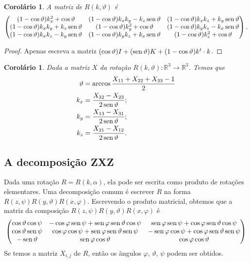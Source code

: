 \documentclass[12pt]{amsart}
\newcommand{\R}{\mathbb R}
\DeclareMathOperator{\sen}{\textrm{\rm sen}}
\newtheorem{corollary}[theorem]{Corolário}
\theoremstyle{definition}
\begin{document}
\begin{corollary}
    A matriz de $R(k,\vartheta)$ é 
    \[
        \begin{pmatrix}
            (1-\cos\vartheta)k_x^2+\cos\vartheta & (1-\cos\vartheta)k_xk_y-k_z\sen\vartheta  & 
            (1-\cos\vartheta)k_xk_z+k_y\sen\vartheta \\
            (1-\cos\vartheta)k_xk_y+k_z\sen\vartheta  & (1-\cos\vartheta)k_y^2+\cos\vartheta  & 
            (1-\cos\vartheta)k_yk_z-k_x\sen\vartheta \\
            (1-\cos\vartheta)k_xk_z-k_y\sen\vartheta & (1-\cos\vartheta)k_yk_z+k_x\sen\vartheta  & 
            (1-\cos\vartheta)k_z^2+\cos\vartheta
        \end{pmatrix}.
    \]
\end{corollary}
\begin{proof} Apenas escreva a matriz $(\cos\vartheta) I+(\sen\vartheta) K+(1-\cos\vartheta)k^t\cdot k$.
\end{proof}

\begin{corollary}
    Dada a matriz $X$ da rotação $R(k,\vartheta):\R^3\to\R^3$. Temos que
    \begin{align*}
        \vartheta&=\arccos\frac{X_{11}+X_{22}+X_{33}-1}2\\
        k_x&=\frac{X_{32}-X_{23}}{2\sen\vartheta};\\
        k_y&=\frac{X_{13}-X_{31}}{2\sen\vartheta};\\
        k_z&=\frac{X_{21}-X_{12}}{2\sen\vartheta}.
    \end{align*}
\end{corollary}

\subsection{A decomposição ZXZ}
Dada uma rotação $R=R(k,\alpha)$, ela pode ser escrita como produto de rotações elementares.
Uma decomposição comum é escrever $R$ na forma $R(z,\psi)R(y,\vartheta)R(x,\varphi)$.
Escrevendo o produto matricial, obtemos que a matriz da composição $R(z,\psi)R(y,\vartheta)R(x,\varphi)$ 
é 
\[
    \begin{pmatrix}
    \cos\vartheta\cos\psi & -\cos\varphi\sen\psi+\sen\varphi\sen\vartheta\cos \psi & \sen\varphi\sen\psi+
    \cos\varphi\sen\vartheta\cos\psi\\
    \cos\vartheta\sen\psi & \cos\varphi\cos\psi+\sen\varphi\sen\vartheta\sen \psi & 
    -\sen\varphi\cos\psi+
    \cos\varphi\sen\vartheta\sen\psi\\
    -\sen\vartheta & \sen\varphi\cos\vartheta & \cos\varphi\cos\vartheta 
    \end{pmatrix}
\]  
Se temos a matriz $X_{i,j}$ de $R$, então os ãngulos $\varphi$, $\vartheta$, $\psi$ podem ser obtidos.
\end{document}
